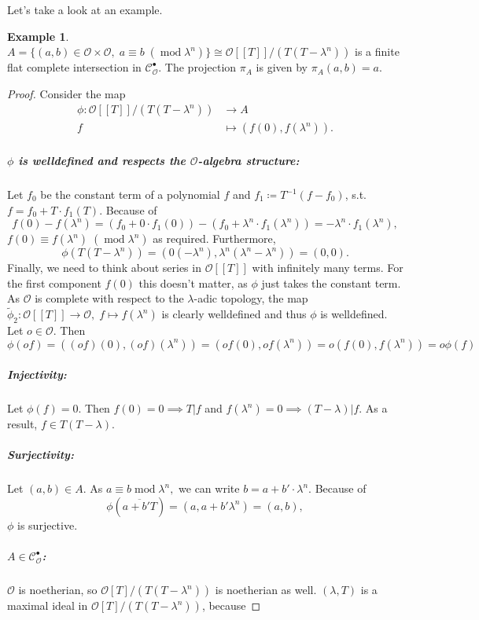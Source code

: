 \documentclass{article}
\theoremstyle{plain}%
\theoremstyle{definition}
\newtheorem{example}{Example}[section]
\theoremstyle{remark}
\newcommand{\cob}{\mathcal{C}_\mathcal{O}^\bullet}
\begin{document}
Let's take a look at an example.
\begin{example}\label{ex:first_1}
    \(A = \{(a,b) \in \mathcal{O}\times\mathcal{O},\; a \equiv b\; (\operatorname{mod} \lambda^n)\} 
    \cong \mathcal{O}[[T]]/(T(T-\lambda^n))\) is a finite flat complete intersection in \(\cob\).
    The projection \(\pi_A\) is given by \(\pi_A(a,b) = a\).
    \begin{proof}
        Consider the map
        \begin{align*}
            \phi\colon \mathcal{O}[[T]]/(T(T-\lambda^n)) &\to A\\
            f &\mapsto (f(0), f(\lambda^n)).
        \end{align*}
        \subparagraph*{\(\phi\) is welldefined and respects the \(\mathcal{O}\)-algebra structure:}
        Let \(f_0\) be the constant term of a polynomial \(f\) and \(f_1 \coloneqq T^{-1}(f-f_0)\), 
        s.t. \(f = f_0 + T\cdot f_1(T)\). Because of
        \[
            f(0) - f(\lambda^n) 
            = (f_0 + 0\cdot f_1(0)) - (f_0 + \lambda^n \cdot f_1(\lambda^n)) 
            = -\lambda^n \cdot f_1(\lambda^n),
        \]
        \(f(0) \equiv f(\lambda^n)\; (\operatorname{mod} \lambda^n)\) as required.
        Furthermore, \[\phi(T(T-\lambda^n)) = (0(-\lambda^n), \lambda^n(\lambda^n - \lambda^n)) = (0,0).\]
        Finally, we need to think about series in \(\mathcal{O}[[T]]\) with infinitely many terms.
        For the first component \(f(0)\) this doesn't matter, as \(\phi\) just takes the constant term. 
        As \(\mathcal{O}\) is complete with respect to the \(\lambda\)-adic topology, 
        the map \(\tilde\phi_2\colon \mathcal{O}[[T]] \to \mathcal{O},\; f \mapsto f(\lambda^n)\) 
        is clearly welldefined and thus \(\phi\) is welldefined.
        Let \(o \in \mathcal{O}\). Then 
        \[\phi(of) = ((of)(0),(of)(\lambda^n)) = (of(0), of(\lambda^n)) = o(f(0), f(\lambda^n)) = o\phi(f)\]
        \subparagraph*{Injectivity:}
        Let \(\phi(f) = 0\). Then \(f(0) = 0 \implies T | f\) and \(f(\lambda^n) = 0 \implies (T - \lambda) | f\).
        As a result, \(f \in T(T-\lambda)\).
        \subparagraph{Surjectivity:}
        Let \((a,b) \in A\).
        As \(a \equiv b \operatorname{mod} \lambda^n,\) we can write \(b = a + b' \cdot \lambda^n\). Because of
        \[\phi(\overline{a + b'T}) = (a, a + b' \lambda^n) = (a,b),\] \(\phi\) is surjective.
        \subparagraph*{\(A\in \cob\):}
        \(\mathcal{O}\) is noetherian, so \(\mathcal{O}[T]/(T(T-\lambda^n))\) is noetherian as well.
        \((\lambda, T)\) is a maximal ideal in \(\mathcal{O}[T]/(T(T-\lambda^n))\), because

\end{proof}
\end{example}
\end{document}
